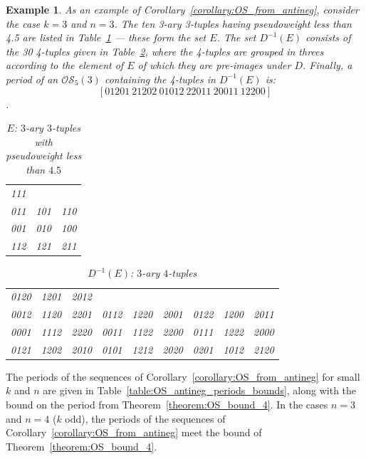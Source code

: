 \documentclass[a4paper,11pt]{article}
\newtheorem{example}[lemma]{Example}
\begin{document}
\begin{example}
As an example of Corollary~\ref{corollary:OS_from_antineg}, consider the case $k=3$ and $n=3$.
The
ten 3-ary 3-tuples having pseudoweight less than 4.5 are listed in
Table~\ref{table:3-ary_3_tuples}
--- these form the set $E$.  The set $D^{-1}(E)$ consists of the 30 4-tuples given in
Table~\ref{table:3-ary_4_tuples}, where the 4-tuples are grouped in threes according to the
element
of $E$ of which they are pre-images under $D$.  Finally, a period of an $\mathcal{OS}_5(3)$
containing the 4-tuples in $D^{-1}(E)$ is:
\[ [01201~21202~01012~22011~20011~12200] \].

\begin{table}[htb]
\caption{$E$: $3$-ary $3$-tuples with pseudoweight less than $4.5$} \label{table:3-ary_3_tuples}
\begin{center}


\begin{tabular}{ccc}
\hline
111 \\
011 & 101 & 110 \\
001 & 010 & 100 \\
112 & 121 & 211 \\
\hline
\end{tabular}

\end{center}
\end{table}

\begin{table}[htb]
\caption{$D^{-1}(E)$: $3$-ary $4$-tuples} \label{table:3-ary_4_tuples}
\begin{center}


\begin{tabular}{ccc|ccc|ccc}
\hline
0120 & 1201 & 2012 &   \\
0012 & 1120 & 2201 & 0112 & 1220 & 2001 & 0122 & 1200 & 2011 \\
0001 & 1112 & 2220 & 0011 & 1122 & 2200 & 0111 & 1222 & 2000 \\
0121 & 1202 & 2010 & 0101 & 1212 & 2020 & 0201 & 1012 & 2120 \\
\hline
\end{tabular}

\end{center}
\end{table}

\end{example}

The periods of the sequences of Corollary~\ref{corollary:OS_from_antineg} for small $k$ and $n$ are
given in Table~\ref{table:OS_antineg_periods_bounds}, along with the bound on the period from
Theorem~\ref{theorem:OS_bound_4}. In the cases $n=3$ and $n=4$ ($k$ odd), the periods of the
sequences of Corollary~\ref{corollary:OS_from_antineg} meet the bound of
Theorem~\ref{theorem:OS_bound_4}.
\end{document}

